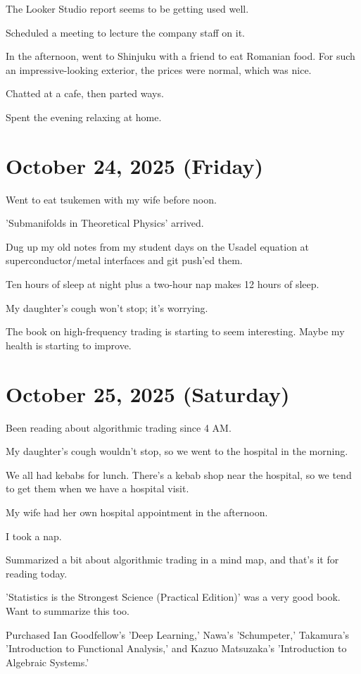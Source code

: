 \documentclass{article}
\begin{document}
The Looker Studio report seems to be getting used well.

Scheduled a meeting to lecture the company staff on it.

In the afternoon, went to Shinjuku with a friend to eat Romanian food.
For such an impressive-looking exterior, the prices were normal, which was nice.

Chatted at a cafe, then parted ways.

Spent the evening relaxing at home.

\section{October 24, 2025 (Friday)}

Went to eat tsukemen with my wife before noon.

'Submanifolds in Theoretical Physics' arrived.

Dug up my old notes from my student days on the Usadel equation at superconductor/metal interfaces and git push'ed them.

Ten hours of sleep at night plus a two-hour nap makes 12 hours of sleep.

My daughter's cough won't stop; it's worrying.

The book on high-frequency trading is starting to seem interesting.
Maybe my health is starting to improve.

\section{October 25, 2025 (Saturday)}

Been reading about algorithmic trading since 4 AM.

My daughter's cough wouldn't stop, so we went to the hospital in the morning.

We all had kebabs for lunch.
There's a kebab shop near the hospital, so we tend to get them when we have a hospital visit.

My wife had her own hospital appointment in the afternoon.

I took a nap.

Summarized a bit about algorithmic trading in a mind map, and that's it for reading today.

'Statistics is the Strongest Science (Practical Edition)' was a very good book.
Want to summarize this too.

Purchased Ian Goodfellow's 'Deep Learning,' Nawa's 'Schumpeter,' Takamura's 'Introduction to Functional Analysis,' and Kazuo Matsuzaka's 'Introduction to Algebraic Systems.'
\end{document}

